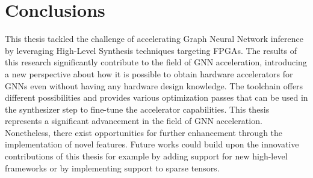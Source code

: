 \documentclass[11pt,a4paper,twocolumn]{article}
\begin{document}
\section{Conclusions}
This thesis tackled the challenge of accelerating Graph Neural Network inference by leveraging High-Level Synthesis techniques targeting FPGAs.
The results of this research significantly contribute to the field of GNN acceleration, introducing a new perspective about how it is possible to obtain hardware accelerators for GNNs even without having any hardware design knowledge.
The toolchain offers different possibilities and provides various optimization passes that can be used in the synthesizer step to fine-tune the accelerator capabilities.
This thesis represents a significant advancement in the field of GNN acceleration.
Nonetheless, there exist opportunities for further enhancement through the implementation of novel features.
Future works could build upon the innovative contributions of this thesis for example by adding support for new high-level frameworks or by implementing support to sparse tensors.


\end{document}
